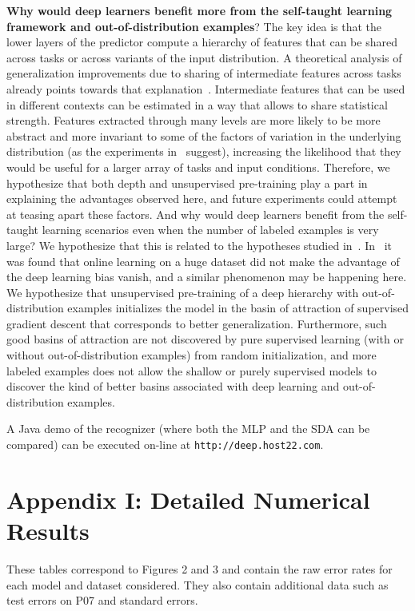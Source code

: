 \documentclass{article} %
\begin{document}
{\bf Why would deep learners benefit more from the self-taught learning 
framework and out-of-distribution examples}?
The key idea is that the lower layers of the predictor compute a hierarchy
of features that can be shared across tasks or across variants of the
input distribution. A theoretical analysis of generalization improvements
due to sharing of intermediate features across tasks already points
towards that explanation~\citep{baxter95a}.
Intermediate features that can be used in different
contexts can be estimated in a way that allows to share statistical 
strength. Features extracted through many levels are more likely to
be more abstract and more invariant to some of the factors of variation
in the underlying distribution (as the experiments in~\citet{Goodfellow2009} suggest),
increasing the likelihood that they would be useful for a larger array
of tasks and input conditions.
Therefore, we hypothesize that both depth and unsupervised
pre-training play a part in explaining the advantages observed here, and future
experiments could attempt at teasing apart these factors.
And why would deep learners benefit from the self-taught learning
scenarios even when the number of labeled examples is very large?
We hypothesize that this is related to the hypotheses studied
in~\citet{Erhan+al-2010}. In~\citet{Erhan+al-2010}
it was found that online learning on a huge dataset did not make the
advantage of the deep learning bias vanish, and a similar phenomenon
may be happening here. We hypothesize that unsupervised pre-training
of a deep hierarchy with out-of-distribution examples initializes the
model in the basin of attraction of supervised gradient descent
that corresponds to better generalization. Furthermore, such good
basins of attraction are not discovered by pure supervised learning
(with or without out-of-distribution examples) from random initialization, and more labeled examples
does not allow the shallow or purely supervised models to discover
the kind of better basins associated
with deep learning and out-of-distribution examples.
 
A Java demo of the recognizer (where both the MLP and the SDA can be compared) 
can be executed on-line at {\tt http://deep.host22.com}.

\iffalse
\section*{Appendix I: Detailed Numerical Results}

These tables correspond to Figures 2 and 3 and contain the raw error rates for each model and dataset considered.
They also contain additional data such as test errors on P07 and standard errors.
\end{document}
